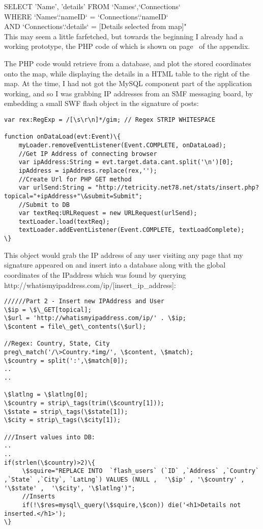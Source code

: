 \documentclass[11pt]{article} %
\newcommand{\tab}{\hspace*{2em}}
\begin{document}
 SELECT 'Name', 'details' FROM `Names`,`Connections`\\
\tab WHERE `Names`.`nameID` = `Connections`.`nameID`\\
\tab AND `Connections`.`details` = [Details selected from map]"\\

This may seem a little farfetched, but towards the beginning I already had a working prototype, the PHP code of which is shown on page~\pageref{gmaps} of the appendix.

The PHP code would retrieve from a database, and plot the stored coordinates onto the map, while displaying the details in a HTML table to the right of the map. At the time, I had not got the MySQL component part of the application working, and so I was grabbing IP addresses from an SMF messaging board, by embedding a small SWF flash object in the signature of posts:

\begin{lstlisting}[title=\bf Snippet from counter.fla]
var rex:RegExp = /[\s\r\n]*/gim; // Regex STRIP WHITESPACE

function onDataLoad(evt:Event)\{
	myLoader.removeEventListener(Event.COMPLETE, onDataLoad);
	//Get IP Address of connecting browser
	var ipAddress:String = evt.target.data.cant.split('\n')[0];
	ipAddress = ipAddress.replace(rex,'');
	//Create Url for PHP GET method
	var urlSend:String = "http://tetricity.net78.net/stats/insert.php?topical="+ipAddress+"\&submit=Submit";
	//Submit to DB
	var textReq:URLRequest = new URLRequest(urlSend);
	textLoader.load(textReq);
	textLoader.addEventListener(Event.COMPLETE, textLoadComplete);
\}
\end{lstlisting}
This object would grab the IP address of any user visiting any page that my signature appeared on and insert into a database along with the global coordinates of the IPaddress which was found by querying http://whatismyipaddress.com/ip/[insert\_ip\_address]:

\begin{lstlisting}[title=\bf Snippet from insert.php]
//////Part 2 - Insert new IPAddress and User
\$ip = \$\_GET[topical];
\$url = 'http://whatismyipaddress.com/ip/' . \$ip;
\$content = file\_get\_contents(\$url);

//Regex: Country, State, City
preg\_match('/\>Country.*img/', \$content, \$match); 
\$country = split(':',\$match[0]);
..
..

\$latlng = \$latlng[0];
\$country = strip\_tags(trim(\$country[1]));
\$state = strip\_tags(\$state[1]);
\$city = strip\_tags(\$city[1]);

///Insert values into DB:
..
..
if(strlen(\$country)>2)\{
     \$squire="REPLACE INTO  `flash_users` (`ID` ,`Address` ,`Country` ,`State` ,`City`, `LatLng`) VALUES (NULL ,  '\$ip' , '\$country' , '\$state' ,  '\$city', '\$latlng')";
     //Inserts
     if(!\$res=mysql\_query(\$squire,\$con)) die('<h1>Details not inserted.</h1>');
\}
\end{lstlisting}
\end{document}

